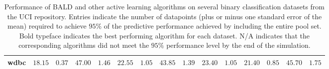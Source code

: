 \begin{table}
{\begin{tabular}{lc@{$\pm$}cc@{$\pm$}cc@{$\pm$}cc@{$\pm$}cc@{$\pm$}cc@{$\pm$}cc@{$\pm$}c}
wdbc & {  $ \bm{18.15} $ } & { $ \bm{0.37} $ } & {  $ 47.00 $ } & { $ 1.46 $ } & {  $ 22.55 $ } & { $ 1.05 $ } & {  $ 43.85 $ } & { $ 1.39 $ } & {  $ 23.40 $ } & { $ 1.05 $ } & {  $ 21.40 $ } & { $ 0.85 $ } & {  $ 45.70 $ } & { $ 1.75 $ } \\ 
\hline
\end{tabular}
}
\caption{Performance of BALD and other active learning algorithms on several binary classification datasets from the UCI repository. 
Entries indicate the number of datapoints (plus or minus one standard error of the mean) required to achieve $95\%$ of the predictive performance
achieved by including the entire pool set. Bold typeface indicates the best performing algorithm for each dataset. 
N/A indicates that the corresponding algorithms did not meet the $95\%$ performance level by the end of the simulation.\label{tab:activeTable} }
\end{table}
